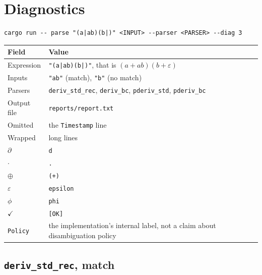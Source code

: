 \chapter{Diagnostics}
\label{app:diagnostic-reports}

\begin{verbatim}
cargo run -- parse "(a|ab)(b|)" <INPUT> --parser <PARSER> --diag 3
\end{verbatim}

\begin{center}
\begin{tabular}{@{}l>{\raggedright\arraybackslash}p{10.5cm}@{}}
\hline
Field & Value \\
\hline
Expression & \texttt{"(a|ab)(b|)"}, that is $(a+ab)(b+\varepsilon)$ \\
Inputs & \texttt{"ab"} (match), \texttt{"b"} (no match) \\
Parsers & \texttt{deriv\_std\_rec}, \texttt{deriv\_bc}, \texttt{pderiv\_std}, \texttt{pderiv\_bc} \\
Output file & \texttt{reports/report.txt} \\
\hline
Omitted & the \texttt{Timestamp} line \\
Wrapped & long lines \\
$\partial$ & \texttt{d} \\
$\cdot$ & \texttt{.} \\
$\oplus$ & \texttt{(+)} \\
$\varepsilon$ & \texttt{epsilon} \\
$\phi$ & \texttt{phi} \\
$\checkmark$ & \texttt{[OK]} \\
\texttt{Policy} & the implementation's internal label, not a claim about
                  disambiguation policy \\
\hline
\end{tabular}
\end{center}

\section{\texttt{deriv\_std\_rec}, match}
\label{app:report-deriv-std-match}

